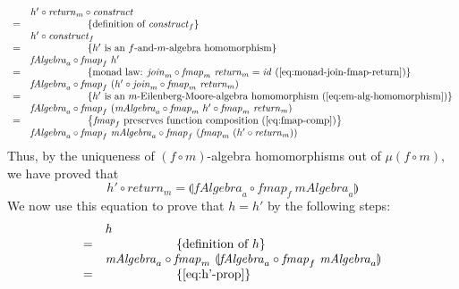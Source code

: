 \documentclass{jfp1}
\newcommand{\fold}[1]{\llparenthesis #1 \rrparenthesis}
\newcommand{\eqAnnotation}[1]{\hspace{2cm}\left\{\textrm{#1}\right\}}
\begin{document}
\begin{proof*}
\begin{enumerate}
\begin{displaymath}
      \begin{array}{cl}
        & h' \circ \mathit{return}_m \circ \mathit{construct} \\
        =&\eqAnnotation{definition of $\mathit{construct}_f$} \\
        & h' \circ \mathit{construct}_f \\
        =&\eqAnnotation{$h'$ is an $f$-and-$m$-algebra homomorphism} \\
        & \mathit{fAlgebra}_a \circ \mathit{fmap}_f~h' \\
        =&\eqAnnotation{monad law: $\mathit{join}_m \circ \mathit{fmap}_m~\mathit{return}_m = \mathit{id}$ (\autoref{eq:monad-join-fmap-return})} \\
        & \mathit{fAlgebra}_a \circ \mathit{fmap}_f~(h' \circ \mathit{join}_m \circ \mathit{fmap}_m~\mathit{return}_m) \\
        =&\eqAnnotation{$h'$ is an $m$-Eilenberg-Moore-algebra homomorphism (\autoref{eq:em-alg-homomorphism})} \\
        & \mathit{fAlgebra}_a \circ \mathit{fmap}_f~(\mathit{mAlgebra}_a \circ \mathit{fmap}_m~h' \circ \mathit{fmap}_m~\mathit{return}_m) \\
        =&\eqAnnotation{$\mathit{fmap}_f$ preserves function composition (\autoref{eq:fmap-comp})} \\
        & \mathit{fAlgebra}_a \circ \mathit{fmap}_f~\mathit{mAlgebra}_a \circ \mathit{fmap}_f~(\mathit{fmap}_m~(h' \circ \mathit{return}_m))
      \end{array}
    \end{displaymath}
    Thus, by the uniqueness of $(f \circ m)$-algebra homomorphisms out
    of $\mu(f \circ m)$, we have proved that 
    \begin{equation}\label{eq:h'-prop}
      h' \circ \mathit{return}_m = \fold{\mathit{fAlgebra}_a \circ \mathit{fmap}_f~\mathit{mAlgebra}_a}
    \end{equation}
    We now use this equation to prove that $h=h'$ by the following
    steps:
    \begin{displaymath}
      \begin{array}{cl}
        & h \\
        =&\eqAnnotation{definition of $h$} \\
        &\mathit{mAlgebra}_a \circ \mathit{fmap}_m~\fold{\mathit{fAlgebra}_a \circ \mathit{fmap}_f~\mathit{mAlgebra}_a} \\
        =&\eqAnnotation{\autoref{eq:h'-prop}} \\

\end{array}
\end{displaymath}
\end{enumerate}
\end{proof*}
\end{document}
